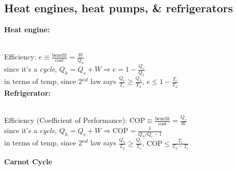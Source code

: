 \documentclass[letterpaper,landscape,10pt]{article}
\begin{document}
{\begin{multicols}{4}
	\subsection*{Heat engines, heat pumps, \& refrigerators}
	\textbf{Heat engine:} \\
	  \begin{minipage}{\columnwidth}
	  \end{minipage}\\
	\hspace{5pt} Efficiency: $e \equiv \frac{\textrm{benefit}}{\textrm{cost}} = \frac{W}{Q_h}$ \\
	\hspace{5pt} since it's a \emph{cycle}, $Q_h = Q_c+W \Rightarrow e = 1-\frac{Q_c}{Q_h}$\\
	\hspace{5pt} in terms of temp, since 2$^{nd}$ law says $\frac{Q_c}{T_c} \geq \frac{Q_h}{T_h}$, $e \leq 1-\frac{T_c}{T_h}$\\
	\textbf{Refrigerator:} \\
	  \begin{minipage}{\columnwidth}
	  \end{minipage}\\
	\hspace{5pt} Efficiency (Coefficient of Performance): $\textrm{COP} \equiv \frac{\textrm{benefit}}{\textrm{cost}} = \frac{Q_c}{W}$ \\
	\hspace{5pt} since it's a \emph{cycle}, $Q_h = Q_c+W \Rightarrow \textrm{COP} = \frac{1}{Q_h/Q_c-1}$\\
	\hspace{5pt} in terms of temp, since 2$^{nd}$ law says $\frac{Q_h}{T_h} \geq \frac{Q_c}{T_c}$, $\textrm{COP} \leq \frac{T_c}{T_h-T_c}$\\
	\begin{minipage}{\columnwidth}
		\textbf{Carnot Cycle} \\

\end{minipage}
\end{multicols}}
\end{document}
